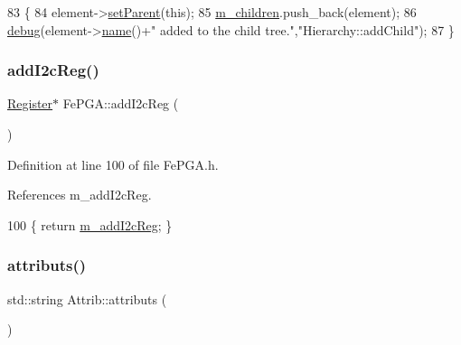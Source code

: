 \begin{DoxyCode}
83                                           \{
84   element->\hyperlink{classHierarchy_a585ad1aeec16077a0e532ab8b4fc557b}{setParent}(\textcolor{keyword}{this});
85   \hyperlink{classHierarchy_a038816763941fd4a930504917f60483b}{m\_children}.push\_back(element);
86   \hyperlink{classObject_aac010553f022165573714b7014a15f0d}{debug}(element->\hyperlink{classObject_a300f4c05dd468c7bb8b3c968868443c1}{name}()+\textcolor{stringliteral}{" added to the child tree."},\textcolor{stringliteral}{"Hierarchy::addChild"});
87 \}
\end{DoxyCode}
\mbox{\label{classFePGA_a64feabdb09e65b1b4b1376a4da713570}} 
\subsubsection{\texorpdfstring{add\+I2c\+Reg()}{addI2cReg()}}
{\footnotesize\ttfamily \hyperlink{classRegister}{Register}$\ast$ Fe\+P\+G\+A\+::add\+I2c\+Reg (\begin{DoxyParamCaption}{ }\end{DoxyParamCaption})\hspace{0.3cm}{\ttfamily [inline]}}



Definition at line 100 of file Fe\+P\+G\+A.\+h.



References m\+\_\+add\+I2c\+Reg.


\begin{DoxyCode}
100 \{ \textcolor{keywordflow}{return} \hyperlink{classFePGA_af3ef3467ba803e6d3b970ea8982d6246}{m\_addI2cReg};    \}
\end{DoxyCode}
\mbox{\label{classAttrib_aee7bbf16b144887f196e1341b24f8a26}} 
\subsubsection{\texorpdfstring{attributs()}{attributs()}}
{\footnotesize\ttfamily std\+::string Attrib\+::attributs (\begin{DoxyParamCaption}{ }\end{DoxyParamCaption})\hspace{0.3cm}{\ttfamily [inherited]}}

